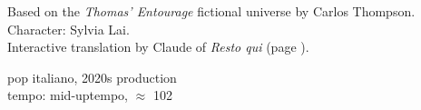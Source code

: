 

\begin{notes}
Based on the \emph{Thomas’ Entourage} fictional universe by Carlos Thompson.\\
Character: Sylvia Lai.\\
Interactive translation by Claude of \emph{Resto qui} (page \pageref{sec:resto-qui}).
\end{notes}

\begin{style}
pop italiano, 2020s production\\
tempo: mid-uptempo, \quarternote\(\approx\) 102
\end{style}

